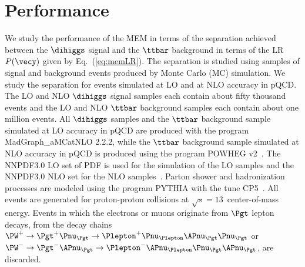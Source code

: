 \section{Performance}
\label{sec:performance}

We study the performance of the MEM in terms of the separation achieved between the $\dihiggs$ signal and the $\ttbar$ background
in terms of the LR $P(\vecy)$ given by Eq.~(\ref{eq:memLR}).
The separation is studied using samples of signal and background events produced by Monte Carlo (MC) simulation.
We study the separation for events simulated at LO and at NLO accuracy in pQCD.
The LO and NLO $\dihiggs$ signal samples each contain about fifty thousand events
and the LO and NLO $\ttbar$ background samples each contain about one million events.
All $\dihiggs$ samples and the $\ttbar$ background sample simulated at LO accuracy in pQCD are produced with the program MadGraph\_aMCatNLO 2.2.2,
while the $\ttbar$ background sample simulated at NLO accuracy in pQCD is produced using the program POWHEG v2~\cite{POWHEG1,POWHEG2,POWHEG3,POWHEGTTBAR1,POWHEGTTBAR2,POWHEGHH1,POWHEGHH2}.
The NNPDF3.0 LO set of PDF is used for the simulation of the LO samples and the NNPDF3.0 NLO set for the NLO samples~\cite{NNPDF1,NNPDF2,NNPDF3}.
Parton shower and hadronization processes are modeled using the program PYTHIA with the tune CP5~\cite{PYTHIA_CP5tune_CMS}.
All events are generated for proton-proton collisions at $\sqrt{s} = 13$~\TeV center-of-mass energy.
Events in which the electrons or muons originate from $\Pgt$ lepton decays,
\ie from the decay chains $\PW^{+} \to \Pgt^{+}\Pnu_{\Pgt} \to \Plepton^{+}\Pnu_{\Plepton}\APnu_{\Pgt}\Pnu_{\Pgt}$ or 
$\PW^{-} \to \Pgt^{-}\APnu_{\Pgt} \to \Plepton^{-}\APnu_{\Plepton}\Pnu_{\Pgt}\APnu_{\Pgt}$, are discarded.

